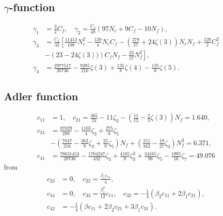 \subsection{$\gamma$-function}
\begin{equation}
	\begin{split}
		\gamma_1 &= \frac{3}{2} C_f, \quad \gamma_2 = \frac{C_f}{48} (97 N_c + 9 C_f - 10 N_f), \\
		\gamma_3 &= \frac{C_f}{32} \left[\frac{11413}{108}N_c^2 - \frac{129}{4} N_c C_f - \left(\frac{278}{27} + 24 \zeta(3) \right) N_c N_f + \frac{129}{2} C_f^2 \right. \\
		&\left.- \left(23 - 24 \zeta(3) ) \right) C_f N_f - \frac{35}{27}N_f^2\right], \\
		\gamma_4 &= \frac{2977517}{20736}-\frac{9295}{216}\zeta(3) + \frac{135}{8} \zeta(4) - \frac{125}{6}\zeta(5).
	\end{split}
\end{equation}	

\subsection{Adler function}
\begin{equation}
	\begin{split}
		c_{11} &= 1, \quad c_{21} = \frac{365}{24} - 11 \zeta_3 - \left(\frac{11}{12} - \frac{2}{3}\zeta(3) \right) N_f = 1.640, \\
		c_{31} &= \frac{87029}{288} - \frac{1103}{4} \zeta_3 + \frac{275}{6} \zeta_5 \\
		& - \left(\frac{7847}{216} - \frac{262}{9} \zeta_3 + \frac{25}{9}\zeta_5 \right) N_f + \left( \frac{151}{162} - \frac{19}{27} \zeta_3 \right) N_f^2 = 6.371, \\
		c_{41} &= \frac{78631453}{20736} - \frac{1704247}{432} \zeta_3 + \frac{4185}{8} \zeta_3^2 + \frac{34165}{96} \zeta_5 - \frac{1995}{16} \zeta_7 = 49.076
	\end{split}
\end{equation}
from \cite{Jamin2006}
\begin{equation}
	\begin{split}
		c_{23} &= 0, \quad c_{22} = \frac{\beta_1 c_{11}}{4}, \\
		c_{34} &= 0, \quad c_{33} = \frac{\beta_1^2}{12} c_{11}, \quad c_{32} = -\frac{1}{4}(\beta_2 c_{11} +  2 \beta_1 c_{21} ), \\
		c_{42} &= -\frac{1}{4} (\beta c_{11} + 2 \beta_2 c_{21} + 3 \beta_1 c_{31}).
	\end{split}
\end{equation}

